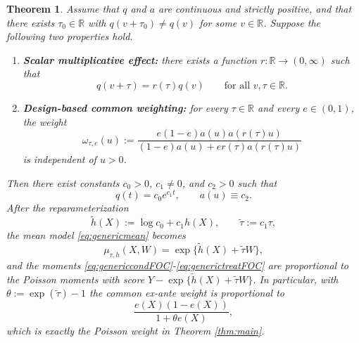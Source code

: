 \documentclass[11pt]{article}
\newtheorem{theorem}{Theorem}
\newcommand{\1}{\mathbf{1}}
\newcommand{\R}{\mathbb{R}}
\begin{document}
\begin{theorem}
\label{thm:characterization}
Assume that $q$ and $a$ are continuous and strictly positive, and that there exists $\tau_0\in\R$ with $q(v+\tau_0)\neq q(v)$ for some $v\in\R$. Suppose the following two properties hold.
\begin{enumerate}[label=(\roman*)]
    \item \textbf{Scalar multiplicative effect:} there exists a function $r:\R\to(0,\infty)$ such that
    \begin{equation}
    q(v+\tau)=r(\tau)q(v)
    \qquad \text{for all } v,\tau\in\R.
    \label{eq:scalaraxiom}
    \end{equation}
    \item \textbf{Design-based common weighting:} for every $\tau\in\R$ and every $e\in(0,1)$, the weight
    \begin{equation}
    \omega_{\tau,e}(u)
    :=
    \frac{e(1-e)a(u)a(r(\tau)u)}{(1-e)a(u)+er(\tau)a(r(\tau)u)}
    \label{eq:omegaaxiom}
    \end{equation}
    is independent of $u>0$.
\end{enumerate}
Then there exist constants $c_0>0$, $c_1\neq 0$, and $c_2>0$ such that
\begin{equation}
q(t)=c_0e^{c_1 t},
\qquad
 a(u)\equiv c_2.
\label{eq:characterizationconclusion}
\end{equation}
After the reparameterization
\[
\tilde h(X):=\log c_0+c_1 h(X),
\qquad
\tilde\tau:=c_1\tau,
\]
the mean model \eqref{eq:genericmean} becomes
\[
\mu_{\tau,h}(X,W)=\exp\{\tilde h(X)+\tilde\tau W\},
\]
and the moments \eqref{eq:genericcondFOC}-\eqref{eq:generictreatFOC} are proportional to the Poisson moments with score $Y-\exp\{\tilde h(X)+\tilde\tau W\}$. In particular, with $\theta:=\exp(\tilde\tau)-1$ the common ex-ante weight is proportional to
\begin{equation}
\frac{e(X)(1-e(X))}{1+\theta e(X)},
\label{eq:poissonweightagain}
\end{equation}
which is exactly the Poisson weight in Theorem \ref{thm:main}.
\end{theorem}
\end{document}
